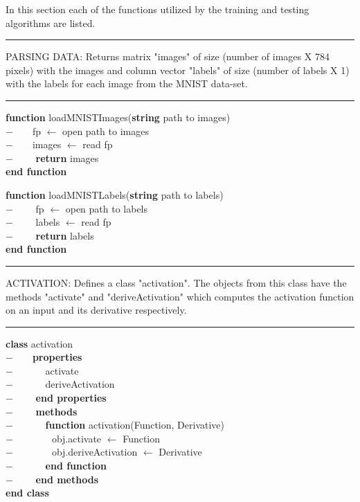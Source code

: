 In this section each of the functions utilized by the training and testing algorithms are listed.\\
\rule{\textwidth}{0.4pt}
PARSING DATA: Returns matrix "images" of size (number of images X 784 pixels) with the images and column vector "labels" of size (number of labels X 1) with the labels for each image from the MNIST data-set.\\
\rule{\textwidth}{0.4pt}
\begin{addmargin}[2em]{0em}
\textbf{function} loadMNISTImages(\textbf{string} path to images)\\
    $- \qquad$fp $\leftarrow$ open path to images\\
    $- \qquad$images $\leftarrow$ read fp\\
    $- \qquad$ \textbf{return} images\\
\textbf{end function}\\
\end{addmargin}
\begin{addmargin}[2em]{0em}
\textbf{function} loadMNISTLabels(\textbf{string} path to labels)\\
$- \qquad$ fp $\leftarrow$ open path to labels\\
    $- \qquad$ labels $\leftarrow$ read fp\\
    $- \qquad$ \textbf{return} labels\\
\textbf{end function}\\
\end{addmargin}
\rule{\textwidth}{0.4pt}
ACTIVATION: Defines a class "activation". The objects from this class have the methods "activate" and "deriveActivation" which computes the activation function on an input and its derivative respectively.\\
\rule{\textwidth}{0.4pt}
\begin{addmargin}[2em]{0em}
\textbf{class} activation\\
    $- \qquad$\textbf{properties}\\
    $- \qquad \quad$ activate\\
    $- \qquad \quad$ deriveActivation\\
    $- \qquad$ \textbf{end properties}\\
    $- \qquad$ \textbf{methods}\\
    $- \qquad \quad$ \textbf{function} activation(Function, Derivative)\\
    $- \qquad \quad \quad $obj.activate $\leftarrow$ Function\\
    $- \qquad \quad \quad $obj.deriveActivation $\leftarrow$ Derivative\\
    $- \qquad \quad$ \textbf{end function}\\
    $- \qquad$ \textbf{end methods}\\
\textbf{end class}\\
\end{addmargin}
